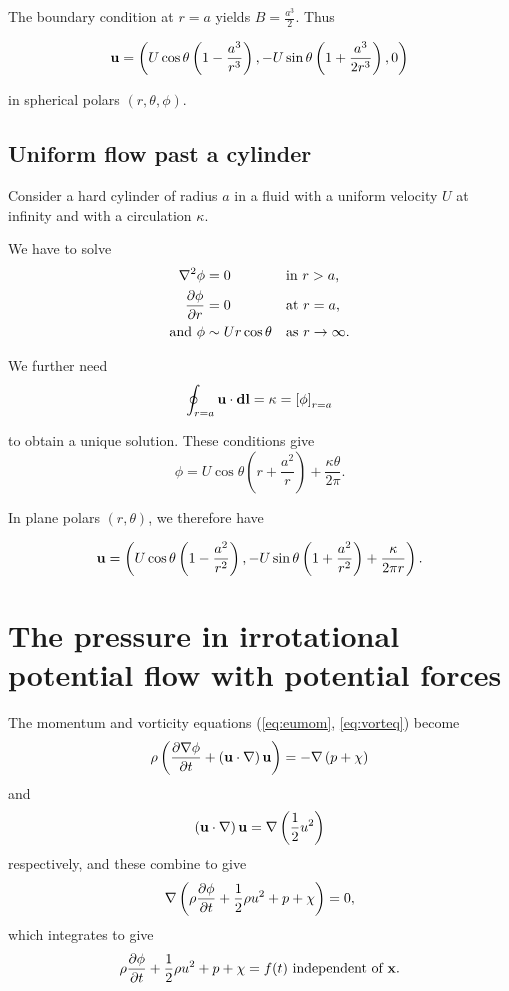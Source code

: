 \documentclass{notes}
\newcommand{\grad}{\nabla}
\newcommand{\lapl}{\nabla^2}
\newcommand{\dgrad}[2]{\left(#1\cdot\nabla\right)#2}
\begin{document}
The boundary condition at $r=a$ yields $B = \frac{a^3}{2}$.  Thus

\[
\mathbf{u} = \left(U \cos \theta \left(1 - \frac{a^3}{r^3} \right),
-U \sin \theta \left( 1 + \frac{a^3}{2 r^3} \right),0\right)
\]

in spherical polars $(r,\theta,\phi)$.

\vspace{4.5in}

\subsection{Uniform flow past a cylinder}

Consider a hard cylinder of radius $a$ in a fluid with a uniform
velocity $U$ at infinity and with a circulation $\kappa$.

We have to solve
\begin{align*}
\lapl\phi &= 0 &&\text{in $r > a$,} \\
\pd{\phi}{r} &= 0 &&\text{at $r=a$,} \\
\text{and } \phi &\sim U r \cos \theta &&\text{as $r \to \infty$.}
\end{align*}

We further need
\[
\oint_{r = a} \mathbf{u} \cdot \mathbf{dl} = \kappa = \left[ \phi \right]_{r=a}
\]

to obtain a unique solution.  These conditions give
\[
\phi = U \cos \theta \left( r + \frac{a^2}{r} \right) + \frac{\kappa
  \theta}{2 \pi}.
\]

In plane polars $(r,\theta)$, we therefore have

\[
\mathbf{u} = \left(U \cos \theta \left( 1 - \frac{a^2}{r^2} \right), - U \sin
  \theta \left( 1+ \frac{a^2}{r^2}\right) + \frac{\kappa}{2 \pi
    r}\right).
\]

\section[Pressure in irrotational flow]{The pressure in irrotational
  potential flow with potential forces}

The momentum and vorticity equations (\ref{eq:eumom}, \ref{eq:vorteq})
become
\[
\rho \left( \pd{\grad{\phi}}{t} + \dgrad{\vu}{\vu} \right) = -\grad
\left( p+ \chi \right)
\]
and
\[
\dgrad{\vu}{\vu} = \grad \left( \frac{1}{2} u^2 \right)
\]
respectively, and these combine to give
\[
\grad \left( \rho \pd{\phi}{t} + \frac{1}{2}\rho u^2 + p +\chi \right)
= 0,
\] which integrates to give
\begin{equation}\label{eq:bern2}
\rho \frac{\partial \phi}{\partial t} + \frac{1}{2}\rho u^2 + p +\chi = f(t) \text{
  independent of $\mathbf{x}$.}
\end{equation}
\end{document}

